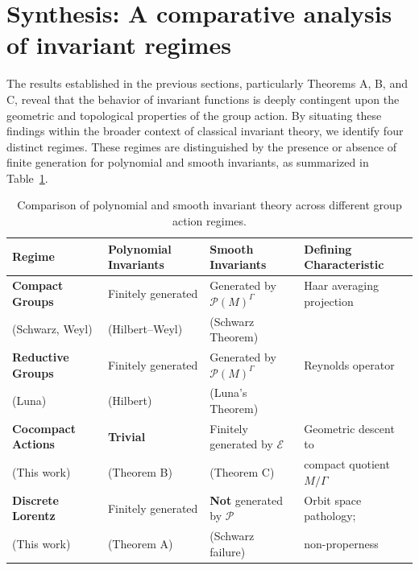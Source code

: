\documentclass[]{article}
\begin{document}
\section{Synthesis: A comparative analysis of invariant regimes}

The results established in the previous sections, particularly Theorems A, B, and C, reveal that the behavior of invariant functions is deeply contingent upon the geometric and topological properties of the group action. By situating these findings within the broader context of classical invariant theory, we identify four distinct regimes. These regimes are distinguished by the presence or absence of finite generation for polynomial and smooth invariants, as summarized in Table~\ref{tab:comparison}.

\begin{table}[ht]
	\centering
	\small
	\renewcommand{\arraystretch}{1.3}
	\begin{tabular}{@{}llll@{}}
		\toprule
		\textbf{Regime} & \textbf{Polynomial Invariants} & \textbf{Smooth Invariants} & \textbf{Defining Characteristic} \\
		\midrule
		\textbf{Compact Groups} & Finitely generated & Generated by $\mathcal{P}(M)^\Gamma$ & Haar averaging projection \\
		(Schwarz, Weyl)         & (Hilbert--Weyl)    & (Schwarz Theorem)                  & \\
		\addlinespace
		\textbf{Reductive Groups} & Finitely generated & Generated by $\mathcal{P}(M)^\Gamma$ & Reynolds operator \\
		(Luna)                    & (Hilbert)          & (Luna's Theorem)                   & \\
		\addlinespace
		\textbf{Cocompact Actions} & \textbf{Trivial} & Finitely generated by $\mathcal{E}$ & Geometric descent to \\
		(This work)                & (Theorem B)      & (Theorem C)                         & compact quotient $M/\Gamma$ \\
		\addlinespace
		\textbf{Discrete Lorentz}  & Finitely generated & \textbf{Not} generated by $\mathcal{P}$ & Orbit space pathology; \\
		(This work)                & (Theorem A)      & (Schwarz failure)                   & non-properness \\
		\bottomrule
	\end{tabular}
	\caption{Comparison of polynomial and smooth invariant theory across different group action regimes.}
	\label{tab:comparison}
\end{table}
\end{document}
